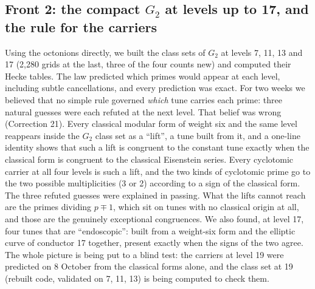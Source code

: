 \documentclass[11pt]{article}
\begin{document}
\subsection{Front 2: the compact $G_2$ at levels up to 17, and the rule for the carriers}
Using the octonions directly, we built the class sets of $G_2$ at levels 7, 11, 13 and 17 (2,280 grids at the last, three of the four counts new) and computed their Hecke tables. The law predicted which primes would appear at each level, including subtle cancellations, and every prediction was exact. For two weeks we believed that no simple rule governed \emph{which} tune carries each prime: three natural guesses were each refuted at the next level. That belief was wrong (Correction 21). Every classical modular form of weight six and the same level reappears inside the $G_2$ class set as a ``lift'', a tune built from it, and a one-line identity shows that such a lift is congruent to the constant tune exactly when the classical form is congruent to the classical Eisenstein series. Every cyclotomic carrier at all four levels is such a lift, and the two kinds of cyclotomic prime go to the two possible multiplicities (3 or 2) according to a sign of the classical form. The three refuted guesses were explained in passing. What the lifts cannot reach are the primes dividing $p\mp1$, which sit on tunes with no classical origin at all, and those are the genuinely exceptional congruences. We also found, at level 17, four tunes that are ``endoscopic'': built from a weight-six form and the elliptic curve of conductor 17 together, present exactly when the signs of the two agree. The whole picture is being put to a blind test: the carriers at level 19 were predicted on 8 October from the classical forms alone, and the class set at 19 (rebuilt code, validated on 7, 11, 13) is being computed to check them.
\end{document}
